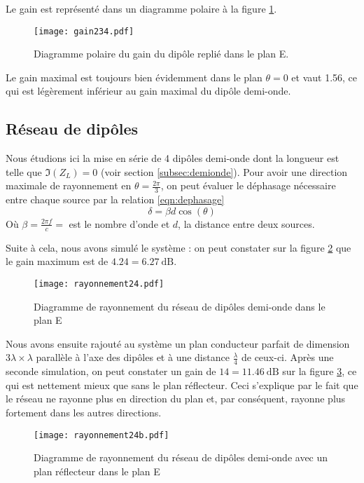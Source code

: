 Le gain est représenté dans un diagramme polaire à la figure \ref{fig:gain234}.
\begin{figure}[htbp]
  \centering
  \texttt{[image: gain234.pdf]}
  \caption{Diagramme polaire du gain du dipôle replié dans le plan E.\label{fig:gain234}}
\end{figure}
Le gain maximal est toujours bien évidemment dans le plan $\theta = 0$ et vaut \num{1.56}, ce qui est légèrement inférieur au gain maximal du dipôle demi-onde.

\subsection{Réseau de dipôles}
Nous étudions ici la mise en série de 4 dipôles demi-onde dont la longueur est telle que $\Im(Z_L)=0$ (voir section \ref{subsec:demionde}). Pour avoir une direction maximale de rayonnement en $\theta=\frac{2\pi}{3}$, on peut évaluer le déphasage nécessaire entre chaque source par la relation \ref{eqn:dephasage}
\begin{equation}\label{eqn:dephasage}
\delta = \beta d \cos(\theta)
\end{equation}
Où $\beta = \frac{2\pi f}{c} = $ est le nombre d'onde et $d$, la distance entre deux sources.

Suite à cela, nous avons simulé le système : on peut constater sur la figure \ref{fig:rayonnement4} que le gain maximum est de $\num{4.24} = \SI{6.27}{\deci\bel}$.

\begin{figure}[htbp]
  \centering
  \texttt{[image: rayonnement24.pdf]}
  \caption{Diagramme de rayonnement du réseau de dipôles demi-onde dans le plan E\label{fig:rayonnement4}}
\end{figure}

Nous avons ensuite rajouté au système un plan conducteur parfait de dimension $3\lambda \times \lambda$ parallèle à l'axe des dipôles et à une distance $\frac{\lambda}{4}$ de ceux-ci. Après une seconde simulation, on peut constater un gain de $\num{14} = \SI{11.46}{\deci\bel}$ sur la figure \ref{fig:rayonnement4reflecteur}, ce qui est nettement mieux que sans le plan réflecteur. Ceci s'explique par le fait que le réseau ne rayonne plus en direction du plan et, par conséquent, rayonne plus fortement dans les autres directions.

\begin{figure}[htbp]
  \centering
  \texttt{[image: rayonnement24b.pdf]}
  \caption{Diagramme de rayonnement du réseau de dipôles demi-onde avec un plan réflecteur dans le plan E\label{fig:rayonnement4reflecteur}}
\end{figure}

